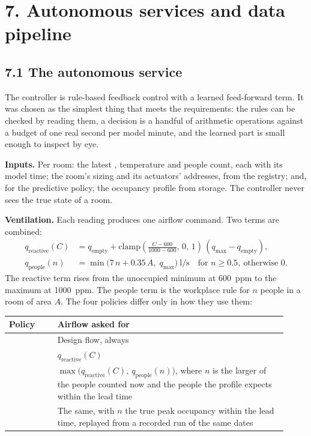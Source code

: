 \section{7. Autonomous services and data pipeline}

\subsection{7.1 The autonomous service}

The controller is rule-based feedback control with a learned feed-forward
term. It was chosen as the simplest thing that meets the requirements: the
rules can be checked by reading them, a decision is a handful of arithmetic
operations against a budget of one real second per model minute, and the
learned part is small enough to inspect by eye.

\textbf{Inputs.} Per room: the latest \COtwo{}, temperature and people count,
each with its model time; the room's sizing and its actuators' addresses, from
the registry; and, for the predictive policy, the occupancy profile from
storage. The controller never sees the true state of a room.

\textbf{Ventilation.} Each \COtwo{} reading produces one airflow command. Two
terms are combined:
\begin{align*}
q_{\mathrm{reactive}}(C) &= q_{\mathrm{empty}} + \mathrm{clamp}\!\left(\frac{C - 600}{1000 - 600},\,0,\,1\right)\,(q_{\max} - q_{\mathrm{empty}}), \\
q_{\mathrm{people}}(n) &= \min\bigl(7\,n + 0.35\,A,\; q_{\max}\bigr)\ \text{l/s}\quad\text{for } n \geq 0.5,\ \text{otherwise } 0.
\end{align*}
The reactive term rises from the unoccupied minimum at 600~ppm to the maximum
at 1000~ppm. The people term is the workplace rule for $n$ people in a room of
area $A$. The four policies differ only in how they use them:

\begin{longtable}[]{@{}L{0.16\linewidth}L{0.76\linewidth}@{}}
\toprule
\textbf{Policy} & \textbf{Airflow asked for} \\
\midrule
\endhead
{} & Design flow, always \\
 & $q_{\mathrm{reactive}}(C)$ \\
 & $\max\bigl(q_{\mathrm{reactive}}(C),\ q_{\mathrm{people}}(n)\bigr)$, where $n$ is the larger of the people counted now and the people the profile expects within the lead time \\
 & The same, with $n$ the true peak occupancy within the lead time, replayed from a recorded run of the same dates \\
\bottomrule
\end{longtable}

